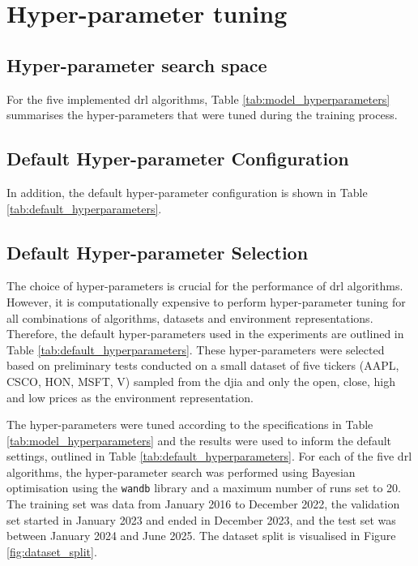 \chapter{Hyper-parameter tuning} \label{app:hyperparameter_tuning}

\section{Hyper-parameter search space} \label{app:hyperparameter_search_space}

For the five implemented \acrlong{drl} algorithms, Table \ref{tab:model_hyperparameters} summarises the hyper-parameters that were tuned during the training process.



\section{Default Hyper-parameter Configuration} \label{app:default_hyperparameters}

In addition, the default hyper-parameter configuration is shown in Table \ref{tab:default_hyperparameters}.


\section{Default Hyper-parameter Selection} \label{app:experiment_hyperparameters}

The choice of hyper-parameters is crucial for the performance of \acrshort{drl} algorithms. However, it is computationally expensive to perform hyper-parameter tuning for all combinations of algorithms, datasets and environment representations. Therefore, the default hyper-parameters used in the experiments are outlined in Table \ref{tab:default_hyperparameters}. These hyper-parameters were selected based on preliminary tests conducted on a small dataset of five tickers (AAPL, CSCO, HON, MSFT, V) sampled from the \acrshort{djia} and only the open, close, high and low prices as the environment representation.

The hyper-parameters were tuned according to the specifications in Table \ref{tab:model_hyperparameters} and the results were used to inform the default settings, outlined in Table \ref{tab:default_hyperparameters}. For each of the five \acrshort{drl} algorithms, the hyper-parameter search was performed using Bayesian optimisation using the \texttt{wandb} library and a maximum number of runs set to 20. The training set was data from January 2016 to December 2022, the validation set started in January 2023 and ended in December 2023, and the test set was between January 2024 and June 2025. The dataset split is visualised in Figure \ref{fig:dataset_split}. 

